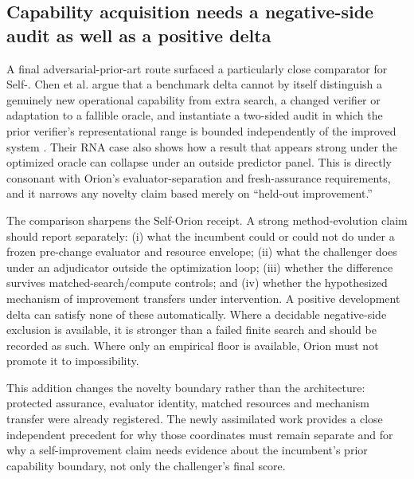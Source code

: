 \subsection{Capability acquisition needs a negative-side audit as well as a positive delta}

A final adversarial-prior-art route surfaced a particularly close comparator for Self-\RAKL{}. Chen et al. argue that a benchmark delta cannot by itself distinguish a genuinely new operational capability from extra search, a changed verifier or adaptation to a fallible oracle, and instantiate a two-sided audit in which the prior verifier's representational range is bounded independently of the improved system \cite{chen2026twosided}. Their RNA case also shows how a result that appears strong under the optimized oracle can collapse under an outside predictor panel. This is directly consonant with Orion's evaluator-separation and fresh-assurance requirements, and it narrows any novelty claim based merely on ``held-out improvement.''

The comparison sharpens the Self-Orion receipt. A strong method-evolution claim should report separately: (i) what the incumbent could or could not do under a frozen pre-change evaluator and resource envelope; (ii) what the challenger does under an adjudicator outside the optimization loop; (iii) whether the difference survives matched-search/compute controls; and (iv) whether the hypothesized mechanism of improvement transfers under intervention. A positive development delta can satisfy none of these automatically. Where a decidable negative-side exclusion is available, it is stronger than a failed finite search and should be recorded as such. Where only an empirical floor is available, Orion must not promote it to impossibility.

This addition changes the novelty boundary rather than the architecture: protected assurance, evaluator identity, matched resources and mechanism transfer were already registered. The newly assimilated work provides a close independent precedent for why those coordinates must remain separate and for why a self-improvement claim needs evidence about the incumbent's prior capability boundary, not only the challenger's final score.
